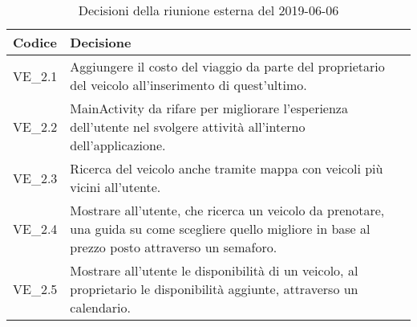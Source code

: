 	\begin{longtable}{ >{\centering}p{} >{}p{}}
		\caption{Decisioni della riunione esterna del 2019-06-06}\\	
		\rowcolorhead
		\textbf{\color{white}Codice} 
		& \centering\textbf{\color{white}Decisione} 
		\tabularnewline 
		\endfirsthead
		VE\_2.1 & Aggiungere il costo del viaggio da parte del proprietario del veicolo all'inserimento di quest'ultimo.
		
		\tabularnewline 
		VE\_2.2 & MainActivity da rifare per migliorare l'esperienza dell'utente nel svolgere attività all'interno dell'applicazione.
		
		\tabularnewline 
		VE\_2.3 & Ricerca del veicolo anche tramite mappa con veicoli più vicini all'utente.
		
		\tabularnewline 
		VE\_2.4 & Mostrare all'utente, che ricerca un veicolo da prenotare, una guida su come scegliere quello migliore in base al prezzo posto attraverso un semaforo.
		
		\tabularnewline 
		VE\_2.5 & Mostrare all'utente le disponibilità di un veicolo, al proprietario le disponibilità aggiunte, attraverso un calendario.
		
	
	\end{longtable}
	




